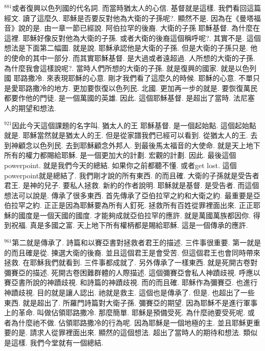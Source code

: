 \documentclass{book}
\begin{document}
$^{881}$或者復興以色列國的代名詞.
而當時猶太人的心信.
基督就是這樣.
我們看回這篇經文.
讀了這麼久.
耶穌是否要反對他為大衛的子孫呢?.
顯然不是.
因為在《曼塔福音》說的是.
由一章一節已經說.
阿伯拉罕的後裔.
大衛的子孫 耶穌基督.
為什麼在這裡.
耶穌好像反對他為大衛的子孫.
或者大衛的後裔這個稱呼呢?.
其實不是.
這個想法是下面第二幅圖.
就是說.
耶穌承認他是大衛的子孫.
但是大衛的子孫只是.
他的使命的其中一部分.
而其實耶穌基督.
是大過或者遠超過.
人所想的大衛的子孫.
為什麼我會這樣說呢?.
當時人們所想的大衛的子孫.
就是復興的國家.
就是以色列國 耶路撒冷.
來表現耶穌的心意.
剛才我們看了這麼久的時候.
耶穌的心意.
不單只是愛耶路撒冷的地方.
更加要恢復以色列民.
北國.
更加再一步的就是.
要恢復萬民都要作他的門徒.
是一個萬國的英雄.
因此.
這個耶穌基督.
是超出了當時.
法尼塞人的期望和想法.

$^{921}$因此今天這個課題的名字叫.
猶太人的王 耶穌基督.
是一個起始點.
這個起始點就是.
耶穌當然就是猶太人的王.
但是從家譜我們已經可以看到.
從猶太人的王.
去到神顧念以色列民.
去到耶穌顧念外邦人.
到最後馬太福音的大使命.
就是天上地下所有的權力都賜給耶穌.
是一個更加大的計劃.
宏觀的計劃.
因此.
最後這個powerpoint.
就是我們今天的總結.
如果你之前都聽不懂.
或者get lost.
這個powerpoint就是總結了.
我們剛才說的所有東西.
的而且確.
大衛的子孫就是受告者君王.
是神的兒子.
要私人拯救.
新約的作者說明.
耶穌就是基督.
是受告者.
而這個想法可以說是.
傳承了很多東西.
首先傳承了亞伯拉罕之約和大衛之約.
最重要是亞伯拉罕之約.
正正是因為耶穌要為所有人釘死.
拯救所有百姓從罪裡面出來.
正正耶穌的國度是一個天國的國度.
才能夠成就亞伯拉罕的應許.
就是萬國萬族都因你.
得到祝福.
真是多國之富.
天上地下所有權柄都是賜給耶穌.
這是一個傳承的應許.

$^{961}$第二就是傳承了.
詩篇和以賽亞書對拯救者君王的描述.
三件事很重要.
第一就是的而且確是從.
揀選大衛的後裔.
並且這個君王是會受苦.
但這個君王也會同時帶來拯救.
在耶穌我們就看到.
三件事都成就了.
另外傳承了一樣東西.
就是死開古卷對彌賽亞的描述.
死開古卷困難群體的人際描述.
這個彌賽亞會私人神蹟歧視.
呼應以賽亞書所說的神蹟歧視.
和詩篇的神蹟歧視.
而的而且確.
耶穌作為彌賽亞.
也進行神蹟歧視.
目的就是讓人認出.
祂就是救主.
這個也是傳承了.
但是.
也超出了一些東西.
就是超出了.
所羅門詩篇對大衛子孫.
彌賽亞的期望.
因為耶穌不是進行軍事上的革命.
叫做佔領耶路撒冷.
那麼簡單.
耶穌是預備受死.
為什麼祂要受死呢.
或者為什麼祂不做.
佔領耶路撒冷的行為呢.
因為耶穌是一個地極的主.
並且耶穌更重要的是.
請求人從罪裡面出來.
顯然的這個想法.
超出了當時人的期待和想法.
類似是這樣.
我們今堂就有一個總結.
\end{document}
